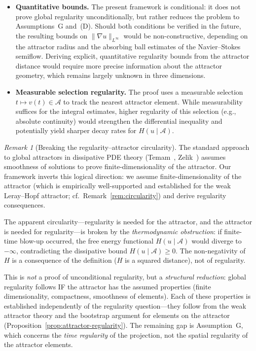 \documentclass[12pt,a4paper]{article}
\theoremstyle{definition}
\theoremstyle{plain}
\theoremstyle{remark}
\newtheorem{remark}[definition]{Remark}
\begin{document}
\begin{itemize}
    \item \textbf{Quantitative bounds.} The present framework is conditional: it does not prove global regularity unconditionally, but rather reduces the problem to Assumptions~G and~(D). Should both conditions be verified in the future, the resulting bounds on $\|\nabla u\|_{L^\infty}$ would be non-constructive, depending on the attractor radius and the absorbing ball estimates of the Navier--Stokes semiflow. Deriving explicit, quantitative regularity bounds from the attractor distance would require more precise information about the attractor geometry, which remains largely unknown in three dimensions.

    \item \textbf{Measurable selection regularity.} The proof uses a measurable selection $t \mapsto v(t) \in \mathcal{A}$ to track the nearest attractor element. While measurability suffices for the integral estimates, higher regularity of this selection (e.g., absolute continuity) would strengthen the differential inequality and potentially yield sharper decay rates for $H(u \mid \mathcal{A})$.
\end{itemize}

\begin{remark}[Breaking the regularity--attractor circularity]
\label{rem:circularity-discussion}
The standard approach to global attractors in dissipative PDE theory
(Temam~\cite{Temam2001}, Zelik~\cite{Zelik2014}) assumes smoothness
of solutions to prove finite-dimensionality of the attractor.
Our framework inverts this logical direction: we assume
finite-dimensionality of the attractor (which is empirically
well-supported and established for the weak Leray--Hopf attractor;
cf.\ Remark~\ref{rem:circularity}) and derive regularity consequences.

The apparent circularity---regularity is needed for the attractor,
and the attractor is needed for regularity---is broken by the
\emph{thermodynamic obstruction}: if finite-time blow-up occurred,
the free energy functional $H(u \mid \mathcal{A})$ would diverge
to~$-\infty$, contradicting the dissipative bound
$H(u \mid \mathcal{A}) \ge 0$.  The non-negativity of~$H$ is a
consequence of the definition ($H$ is a squared distance), not of
regularity.

This is \emph{not} a proof of unconditional regularity, but a
\emph{structural reduction}: global regularity follows IF the
attractor has the assumed properties (finite dimensionality,
compactness, smoothness of elements).  Each of these properties
is established independently of the regularity question---they
follow from the weak attractor theory and the bootstrap argument
for elements on the attractor (Proposition~\ref{prop:attractor-regularity}).
The remaining gap is Assumption~G, which concerns the
\emph{time regularity} of the projection, not the spatial regularity
of the attractor elements.
\end{remark}
\end{document}

